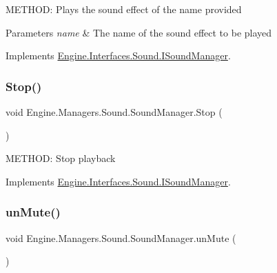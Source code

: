 M\+E\+T\+H\+OD\+: Plays the sound effect of the name provided 


\begin{DoxyParams}{Parameters}
{\em name} & The name of the sound effect to be played\\
\hline
\end{DoxyParams}


Implements \hyperlink{a00482_aa9e2fb77a5fe624ce65373f5ee8328ae}{Engine.\+Interfaces.\+Sound.\+I\+Sound\+Manager}.

\mbox{\label{a00546_a0d3222475855f63b0c8f9dbe9b52e7f7}} 
\subsubsection{\texorpdfstring{Stop()}{Stop()}}
{\footnotesize\ttfamily void Engine.\+Managers.\+Sound.\+Sound\+Manager.\+Stop (\begin{DoxyParamCaption}{ }\end{DoxyParamCaption})\hspace{0.3cm}{\ttfamily [inline]}}



M\+E\+T\+H\+OD\+: Stop playback 



Implements \hyperlink{a00482_ac47a91d3e28a8f7a1e5348fb6eff50e2}{Engine.\+Interfaces.\+Sound.\+I\+Sound\+Manager}.

\mbox{\label{a00546_ad62eb34a308bfe457bc7229045a66af0}} 
\subsubsection{\texorpdfstring{un\+Mute()}{unMute()}}
{\footnotesize\ttfamily void Engine.\+Managers.\+Sound.\+Sound\+Manager.\+un\+Mute (\begin{DoxyParamCaption}{ }\end{DoxyParamCaption})\hspace{0.3cm}{\ttfamily [inline]}}



